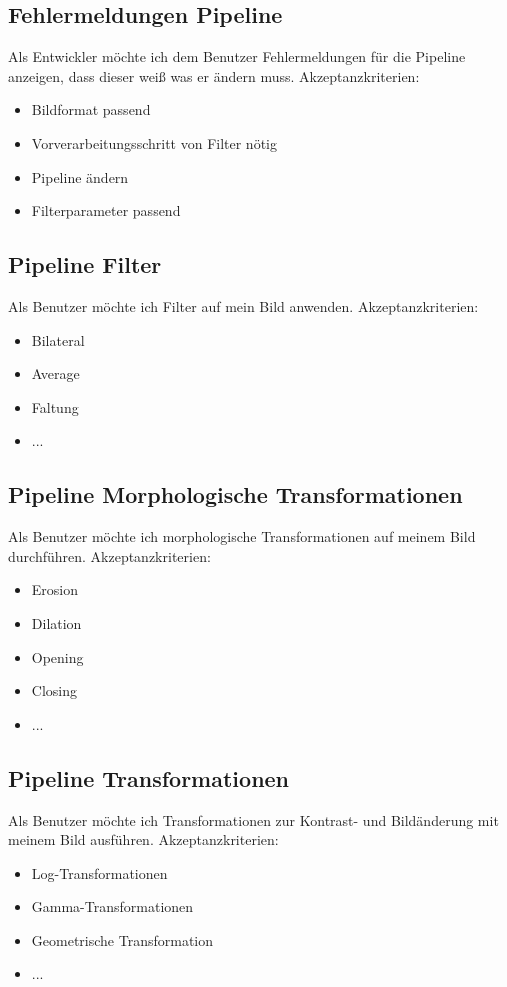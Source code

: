\documentclass[conference]{IEEEtran}
\begin{document}
\subsection{Fehlermeldungen Pipeline}
Als Entwickler möchte ich dem Benutzer Fehlermeldungen für die Pipeline anzeigen, dass dieser weiß was er ändern muss. 
Akzeptanzkriterien: 
\begin{itemize}
	\item Bildformat passend
	\item Vorverarbeitungsschritt von Filter nötig
	\item Pipeline ändern
	\item Filterparameter passend
\end{itemize}

\subsection{Pipeline Filter}
Als Benutzer möchte ich Filter auf mein Bild anwenden.
Akzeptanzkriterien:
\begin{itemize}
	\item Bilateral
	\item Average
	\item Faltung
	\item ...
\end{itemize}

\subsection{Pipeline Morphologische Transformationen}
Als Benutzer möchte ich morphologische Transformationen auf meinem Bild durchführen.
Akzeptanzkriterien:
\begin{itemize}
	\item Erosion
	\item Dilation
	\item Opening
	\item Closing
	\item ...
\end{itemize}

\subsection{Pipeline Transformationen}
Als Benutzer möchte ich Transformationen zur Kontrast- und Bildänderung mit meinem Bild ausführen.
Akzeptanzkriterien:
\begin{itemize}
	\item Log-Transformationen
	\item Gamma-Transformationen
	\item Geometrische Transformation
	\item ...
\end{itemize}
\end{document}
